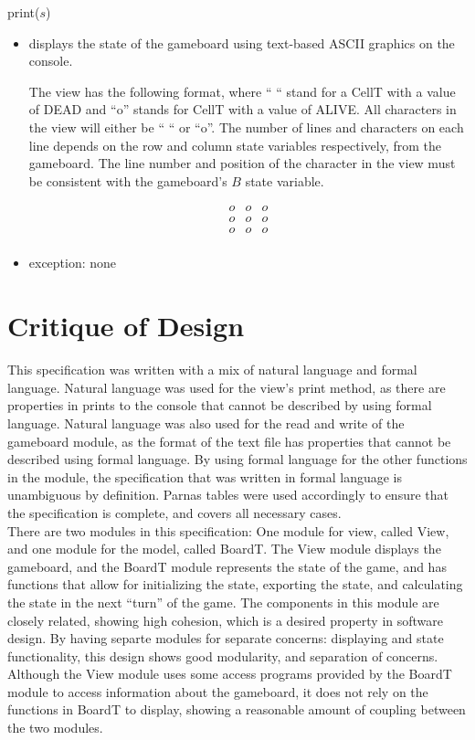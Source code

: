 \documentclass[12pt]{article}
\begin{document}
\noindent print($s$)
\begin{itemize}
\item displays the state of the gameboard using text-based ASCII graphics on the console. 

The view has the following format, where `` `` stand for a CellT with a value of DEAD  and ``o'' stands for CellT with a value of ALIVE. All characters in the view will either be `` `` or  ``o''. The number of lines and characters on each line depends on the row and column state variables respectively, from the gameboard. The line number and position of the character in the view must be consistent with the gameboard's $B$ state variable. 

  \begin{equation}
    \begin{array}{ccc}
      o & o & o   \\
      o & o & o   \\
      o & o & o  \\

    \end{array}
  \end{equation}

\item exception: none
\end{itemize}

\newpage

\section*{Critique of Design}

This specification was written with a mix of natural language and formal language. Natural language was used for the view's print method, as there are properties in prints to the console that cannot be described by using formal language. Natural language was also used for the read and write of the gameboard module, as the format of the text file has properties that cannot be described using formal language. By using formal language for the other functions in the module, the specification that was written in formal language is unambiguous by definition. Parnas tables were used accordingly to ensure that the specification is complete, and covers all necessary cases.\\

There are two modules in this specification: One module for view, called View, and one module for the model, called BoardT. The View module displays the gameboard, and the BoardT module represents the state of the game, and has functions that allow for initializing the state, exporting the state, and calculating the state in the next  ``turn'' of the game. The components in this module are closely related, showing high cohesion, which is a desired property in software design. By having separte modules for  separate concerns: displaying and state functionality, this design shows good modularity, and separation of concerns. Although the View module uses some access programs provided by the BoardT module to access information about the gameboard, it does not rely on the functions in BoardT to display, showing a reasonable amount of coupling between the two modules.\\
\end{document}

